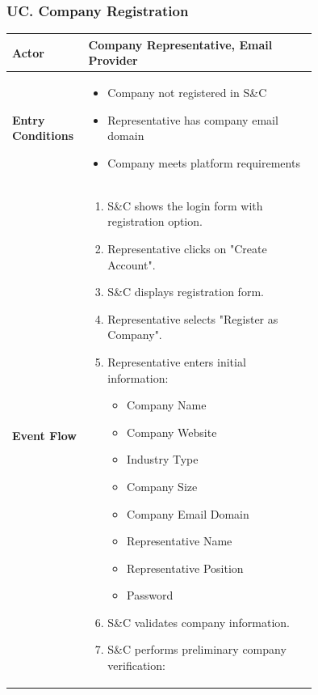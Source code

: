 \subsubsection*{UC\cuc . Company Registration}
\begin{center}
    \begin{longtable}{|l|p{0.75\linewidth}|}
        \hline
        \textbf{Actor}            & Company Representative, Email Provider \\
        \hline
        \textbf{Entry Conditions} & 
        \begin{itemize}
            \item Company not registered in S\&C
            \item Representative has company email domain
            \item Company meets platform requirements
        \end{itemize} \\
        \hline
        \textbf{Event Flow}       & 
        \begin{enumerate}
            \item S\&C shows the login form with registration option.
            \item Representative clicks on "Create Account".
            \item S\&C displays registration form.
            \item Representative selects "Register as Company".
            \item Representative enters initial information:
            \begin{itemize}
                \item Company Name
                \item Company Website
                \item Industry Type
                \item Company Size
                \item Company Email Domain
                \item Representative Name
                \item Representative Position
                \item Password
            \end{itemize}
            \item S\&C validates company information.
            \item S\&C performs preliminary company verification:
            \begin{itemize}

\end{itemize}
\end{enumerate}
\end{longtable}
\end{center}
